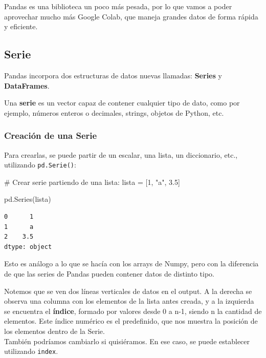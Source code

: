 \documentclass[
  letterpaper,
  DIV=11,
  numbers=noendperiod]{scrreprt}
\newenvironment{Shaded}{\begin{snugshade}}{\end{snugshade}}
\newcommand{\CommentTok}[1]{\textcolor[rgb]{0.37,0.37,0.37}{#1}}
\newcommand{\DecValTok}[1]{\textcolor[rgb]{0.68,0.00,0.00}{#1}}
\newcommand{\FloatTok}[1]{\textcolor[rgb]{0.68,0.00,0.00}{#1}}
\newcommand{\NormalTok}[1]{\textcolor[rgb]{0.00,0.23,0.31}{#1}}
\newcommand{\OperatorTok}[1]{\textcolor[rgb]{0.37,0.37,0.37}{#1}}
\newcommand{\StringTok}[1]{\textcolor[rgb]{0.13,0.47,0.30}{#1}}
\begin{document}
Pandas es una biblioteca un poco más pesada, por lo que vamos a poder
aprovechar mucho más Google Colab, que maneja grandes datos de forma
rápida y eficiente.

\subsection{Serie}\label{serie}

Pandas incorpora dos estructuras de datos nuevas llamadas:
\textbf{Series} y \textbf{DataFrames}.

Una \textbf{serie} es un vector capaz de contener cualquier tipo de
dato, como por ejemplo, números enteros o decimales, strings, objetos de
Python, etc.

\subsubsection{Creación de una Serie}\label{creaciuxf3n-de-una-serie}

Para crearlas, se puede partir de un escalar, una lista, un diccionario,
etc., utilizando \texttt{pd.Serie()}:

\begin{Shaded}
\begin{Highlighting}[]
\CommentTok{\# Crear serie partiendo de una lista:}
\NormalTok{lista }\OperatorTok{=}\NormalTok{ [}\DecValTok{1}\NormalTok{, }\StringTok{"a"}\NormalTok{, }\FloatTok{3.5}\NormalTok{]}

\NormalTok{pd.Series(lista)}
\end{Highlighting}
\end{Shaded}

\begin{verbatim}
0      1
1      a
2    3.5
dtype: object
\end{verbatim}

Esto es análogo a lo que se hacía con los arrays de Numpy, pero con la
diferencia de que las series de Pandas pueden contener datos de distinto
tipo.

Notemos que se ven dos líneas verticales de datos en el output. A la
derecha se observa una columna con los elementos de la lista antes
creada, y a la izquierda se encuentra el \textbf{índice}, formado por
valores desde 0 a n-1, siendo n la cantidad de elementos. Este índice
numérico es el predefinido, que nos muestra la posición de los elementos
dentro de la Serie.\\
También podríamos cambiarlo si quisiéramos. En ese caso, se puede
establecer utilizando \texttt{index}.
\end{document}
